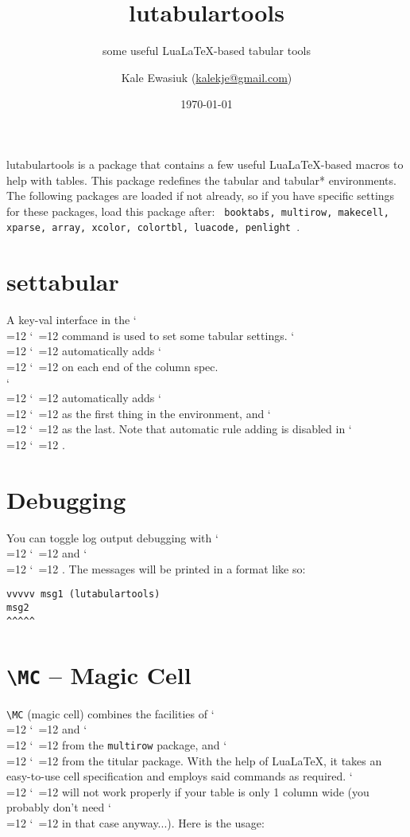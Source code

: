 \documentclass[11pt,parskip=half]{scrartcl}
\author{Kale Ewasiuk (\url{kalekje@gmail.com})}
\date{\today}
\title{lutabulartools}
\subtitle{some useful LuaLaTeX-based tabular tools}
\def\cmd{\bgroup\catcode`\\=12 \catcode`\ =12 \cmdA}
\def\cmdA#1{\egroup{\texttt{\detokenize{#1}}}}
\begin{document}


\maketitle

lutabulartools is a package that contains a few useful Lua\LaTeX-based macros to help with tables.
This package redefines the {\ttfamily tabular} and {\ttfamily tabular*} environments.
The following packages are loaded if not already, so if you have specific settings for these packages, load this package after:
\texttt{
{booktabs},
{multirow},
{makecell},
{xparse},
{array},
{xcolor},
{colortbl},
{luacode},
{penlight}
}.

\section{settabular}

A key-val interface in the \cmd{\settabular{}} command is used to set some tabular settings.
\cmd{nopad} automatically adds \cmd{@{}} on each end of the column spec.\\
\cmd{tbrule} automatically adds \cmd{\toprule} as the first thing in the environment, and \cmd{\bottomrule} as the last.
Note that automatic rule adding is disabled in \cmd{longtable}.
\begin{LTXexample}
\end{LTXexample}

\section{Debugging}
You can toggle log output debugging with \cmd{\lttdebugON} and \cmd{\lttdebugOFF}.
The messages will be printed in a format like so:
\begin{verbatim}
vvvvv msg1 (lutabulartools)
msg2
^^^^^
\end{verbatim}

\section{\texttt{\textbackslash MC} -- Magic Cell}
\texttt{\textbackslash MC} (magic cell) combines the facilities of
\cmd{\multirow} and \cmd{\multicolumn} from the \texttt{multirow} package, and \cmd{\makcell} from the titular package.
With the help of LuaLaTeX, it takes an easy-to-use cell specification and employs said commands as required.
\cmd{\MC} will not work properly if your table is only 1 column wide (you probably don't need \cmd{MC} in that case anyway...).
Here is the usage:
\end{document}
